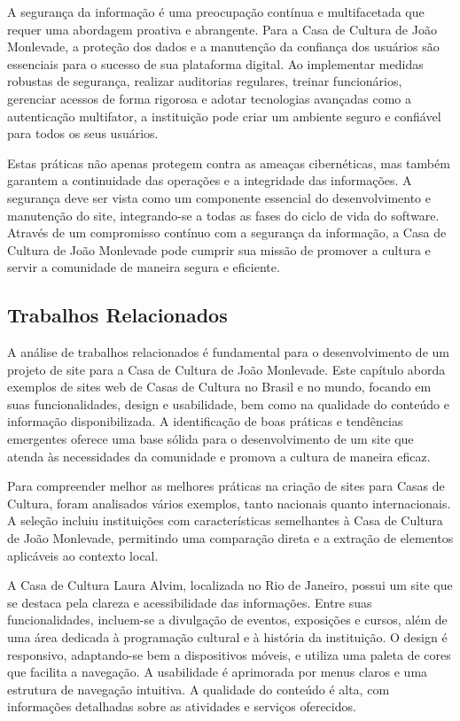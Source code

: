 A segurança da informação é uma preocupação contínua e multifacetada que requer uma abordagem proativa e abrangente. Para a Casa de Cultura de João Monlevade, a proteção dos dados e a manutenção da confiança dos usuários são essenciais para o sucesso de sua plataforma digital. Ao implementar medidas robustas de segurança, realizar auditorias regulares, treinar funcionários, gerenciar acessos de forma rigorosa e adotar tecnologias avançadas como a autenticação multifator, a instituição pode criar um ambiente seguro e confiável para todos os seus usuários.

Estas práticas não apenas protegem contra as ameaças cibernéticas, mas também garantem a continuidade das operações e a integridade das informações. A segurança deve ser vista como um componente essencial do desenvolvimento e manutenção do site, integrando-se a todas as fases do ciclo de vida do software. Através de um compromisso contínuo com a segurança da informação, a Casa de Cultura de João Monlevade pode cumprir sua missão de promover a cultura e servir a comunidade de maneira segura e eficiente.

\subsection{Trabalhos Relacionados}

A análise de trabalhos relacionados é fundamental para o desenvolvimento de um projeto de site para a Casa de Cultura de João Monlevade. Este capítulo aborda exemplos de sites web de Casas de Cultura no Brasil e no mundo, focando em suas funcionalidades, design e usabilidade, bem como na qualidade do conteúdo e informação disponibilizada. A identificação de boas práticas e tendências emergentes oferece uma base sólida para o desenvolvimento de um site que atenda às necessidades da comunidade e promova a cultura de maneira eficaz.

Para compreender melhor as melhores práticas na criação de sites para Casas de Cultura, foram analisados vários exemplos, tanto nacionais quanto internacionais. A seleção incluiu instituições com características semelhantes à Casa de Cultura de João Monlevade, permitindo uma comparação direta e a extração de elementos aplicáveis ao contexto local.

A Casa de Cultura Laura Alvim, localizada no Rio de Janeiro, possui um site que se destaca pela clareza e acessibilidade das informações. Entre suas funcionalidades, incluem-se a divulgação de eventos, exposições e cursos, além de uma área dedicada à programação cultural e à história da instituição. O design é responsivo, adaptando-se bem a dispositivos móveis, e utiliza uma paleta de cores que facilita a navegação. A usabilidade é aprimorada por menus claros e uma estrutura de navegação intuitiva. A qualidade do conteúdo é alta, com informações detalhadas sobre as atividades e serviços oferecidos.

